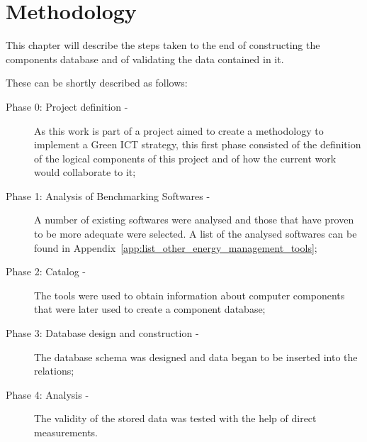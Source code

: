 

\chapter{Methodology} \label{chap3:methodology}

   This chapter will describe the steps taken to the end of constructing the components database and of validating the data contained in it.
   
These can be shortly described as follows:
    \begin{description}
        \item[Phase 0: Project definition -] As this work is part of a project aimed to create a methodology to implement a Green ICT strategy, this first phase consisted of the definition of the logical components of this project and of how the current work would collaborate to it;
        \item[Phase 1: Analysis of Benchmarking Softwares -] A number of existing softwares were analysed and those that have proven to be more adequate were selected. A list of the analysed softwares can be found in Appendix~\ref{app:list_other_energy_management_tools};
        \item[Phase 2: Catalog -] The tools were used to obtain information about computer components that were later used to create a component database;
        \item[Phase 3: Database design and construction -] The database schema was designed and data began to be inserted into the relations;
        \item[Phase 4: Analysis -] The validity of the stored data was tested with the help of direct measurements.
    \end{description}


